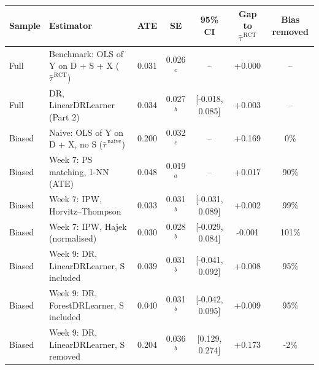 \begin{tabular}{llccccc}
\toprule
Sample & Estimator & ATE & SE & 95\% CI & Gap to $\hat\tau^{\,\mathrm{RCT}}$ & Bias removed \\
\midrule
Full & Benchmark: OLS of Y on D + S + X ($\hat\tau^{\,\mathrm{RCT}}$) & 0.031 & 0.026$^c$ & -- & +0.000 & -- \\
Full & DR, LinearDRLearner (Part 2) & 0.034 & 0.027$^b$ & [-0.018, 0.085] & +0.003 & -- \\
\midrule
Biased & Naive: OLS of Y on D + X, no S ($\hat\tau^{\,\mathrm{naive}}$) & 0.200 & 0.032$^c$ & -- & +0.169 & 0\% \\
Biased & Week 7: PS matching, 1-NN (ATE) & 0.048 & 0.019$^a$ & -- & +0.017 & 90\% \\
Biased & Week 7: IPW, Horvitz--Thompson & 0.033 & 0.031$^b$ & [-0.031, 0.089] & +0.002 & 99\% \\
Biased & Week 7: IPW, Hajek (normalised) & 0.030 & 0.028$^b$ & [-0.029, 0.084] & -0.001 & 101\% \\
\midrule
Biased & Week 9: DR, LinearDRLearner, S included & 0.039 & 0.031$^b$ & [-0.041, 0.092] & +0.008 & 95\% \\
Biased & Week 9: DR, ForestDRLearner, S included & 0.040 & 0.031$^b$ & [-0.042, 0.095] & +0.009 & 95\% \\
Biased & Week 9: DR, LinearDRLearner, S removed & 0.204 & 0.036$^b$ & [0.129, 0.274] & +0.173 & -2\% \\
\bottomrule
\end{tabular}
